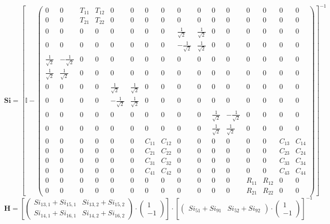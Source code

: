 \[ \mathbf{Si} = \left[ \mathbb{I}  - \left(\begin{smallmatrix} 0 & 0
& T_{11} & T_{12} & 0 & 0 & 0 & 0 & 0 & 0 & 0 & 0 & 0 & 0 & 0 & 0 \\ 0
& 0 & T_{21} & T_{22} & 0 & 0 & 0 & 0 & 0 & 0 & 0 & 0 & 0 & 0 & 0 & 0
\\ 0 & 0 & 0 & 0 & 0 & 0 & 0 & 0 & \frac{1}{\sqrt{2}} &
\frac{1}{\sqrt{2}} & 0 & 0 & 0 & 0 & 0 & 0 \\ 0 & 0 & 0 & 0 & 0 & 0 &
0 & 0 & -\frac{1}{\sqrt{2}} & \frac{1}{\sqrt{2}} & 0 & 0 & 0 & 0 & 0 &
0 \\ \frac{1}{\sqrt{2}} & -\frac{1}{\sqrt{2}} & 0 & 0 & 0 & 0 & 0 & 0
& 0 & 0 & 0 & 0 & 0 & 0 & 0 & 0 \\ \frac{1}{\sqrt{2}} &
\frac{1}{\sqrt{2}} & 0 & 0 & 0 & 0 & 0 & 0 & 0 & 0 & 0 & 0 & 0 & 0 & 0
& 0 \\ 0 & 0 & 0 & 0 & \frac{1}{\sqrt{2}} & \frac{1}{\sqrt{2}} & 0 & 0
& 0 & 0 & 0 & 0 & 0 & 0 & 0 & 0 \\ 0 & 0 & 0 & 0 & -\frac{1}{\sqrt{2}}
& \frac{1}{\sqrt{2}} & 0 & 0 & 0 & 0 & 0 & 0 & 0 & 0 & 0 & 0 \\ 0 & 0
& 0 & 0 & 0 & 0 & 0 & 0 & 0 & 0 & \frac{1}{\sqrt{2}} &
-\frac{1}{\sqrt{2}} & 0 & 0 & 0 & 0 \\ 0 & 0 & 0 & 0 & 0 & 0 & 0 & 0 &
0 & 0 & \frac{1}{\sqrt{2}} & \frac{1}{\sqrt{2}} & 0 & 0 & 0 & 0 \\ 0 &
0 & 0 & 0 & 0 & 0 & C_{11} & C_{12} & 0 & 0 & 0 & 0 & 0 & 0 & C_{13} &
C_{14} \\ 0 & 0 & 0 & 0 & 0 & 0 & C_{21} & C_{22} & 0 & 0 & 0 & 0 & 0
& 0 & C_{23} & C_{24} \\ 0 & 0 & 0 & 0 & 0 & 0 & C_{31} & C_{32} & 0 &
0 & 0 & 0 & 0 & 0 & C_{33} & C_{34} \\ 0 & 0 & 0 & 0 & 0 & 0 & C_{41}
& C_{42} & 0 & 0 & 0 & 0 & 0 & 0 & C_{43} & C_{44} \\ 0 & 0 & 0 & 0 &
0 & 0 & 0 & 0 & 0 & 0 & 0 & 0 & R_{11} & R_{12} & 0 & 0 \\ 0 & 0 & 0 &
0 & 0 & 0 & 0 & 0 & 0 & 0 & 0 & 0 & R_{21} & R_{22} & 0 & 0
\end{smallmatrix}\right) \right]^{-1} \]
\[ \mathbf{H} = \left[ \left(\begin{smallmatrix} Si_{13,1} + Si_{15,1}
& Si_{13,2} + Si_{15,2} \\ Si_{14,1} + Si_{16,1} & Si_{14,2} +
Si_{16,2} \end{smallmatrix}\right) \cdot \left(\begin{smallmatrix} 1
\\ -1 \end{smallmatrix}\right) \right]\cdot\left[
\left(\begin{smallmatrix} Si_{51} + Si_{91} & Si_{52} + Si_{92}
\end{smallmatrix}\right) \cdot \left(\begin{smallmatrix} 1 \\ -1
\end{smallmatrix}\right) \right]^{-1} \]
